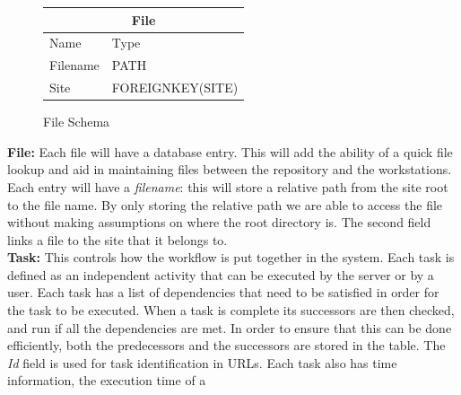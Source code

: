 \documentclass[12pt,a4paper]{report}
\begin{document}
\begin{figure}
\begin{tabular}{l|l}
    \multicolumn{2}{c}{File} \\
    \hline
    Name        & Type \\
    \hline
    Filename    & PATH  \\
    Site        & FOREIGNKEY(SITE)  \\
\end{tabular}
\caption{File Schema}
\end{figure}
\noindent\textbf{File:} Each file will have a database entry.
This will add the ability of a quick file lookup and aid in maintaining files between the
repository and the workstations. Each entry will have a \emph{filename}: this will store
a relative path from the site root to the file name. By only storing the relative path
we are able to access the file without making assumptions on where the root directory
is. The second field links a file to the site that it belongs to.
\\

\noindent \textbf{Task:} This controls how the workflow is put together in the system.
Each task is defined as an independent activity that can be executed by the server or
by a user. Each task has a list of dependencies that need to be satisfied in order
for the task to be executed. When a task is complete its successors are then checked,
and run if all the dependencies are met. In order to ensure that this can be
done efficiently,
both the predecessors and the successors are stored in the table. The \emph{Id} field is
used for task identification in URLs. Each task also has time information, the execution
time of a
\end{document}
